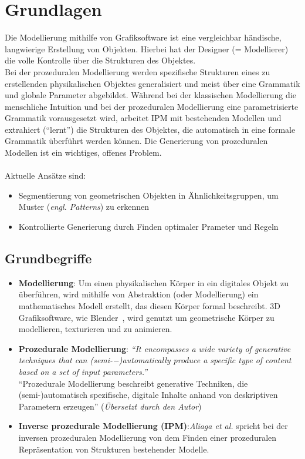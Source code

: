 
\chapter{Grundlagen}

Die Modellierung mithilfe von Grafiksoftware ist eine vergleichbar händische, langwierige Erstellung von
Objekten.
Hierbei hat der Designer (= Modellierer) die volle Kontrolle über die Strukturen des Objektes.\\
Bei der prozeduralen Modellierung werden spezifische Strukturen eines zu erstellenden physikalischen Objektes
generalisiert und meist über eine Grammatik und globale Parameter abgebildet.
Während bei der klassischen Modellierung die menschliche Intuition und bei der prozeduralen Modellierung eine
parametrisierte Grammatik vorausgesetzt wird, arbeitet IPM mit bestehenden Modellen und extrahiert ("`lernt"')
die Strukturen des Objektes, die automatisch in eine formale Grammatik überführt werden können.
Die Generierung von prozeduralen Modellen ist ein wichtiges, offenes Problem.
\\~\\
Aktuelle Ansätze sind:
\begin{itemize}
    \item Segmentierung von geometrischen Objekten in Ähnlichkeitsgruppen, um Muster (\textit{engl. Patterns}) zu
    erkennen
    \item Kontrollierte Generierung durch Finden optimaler Prameter und Regeln
\end{itemize}

\section{Grundbegriffe}

\begin{itemize}
    \item \textbf{Modellierung}: Um einen physikalischen Körper in ein digitales Objekt zu überführen, wird mithilfe
    von Abstraktion (oder Modellierung) ein mathematisches Modell erstellt, das diesen Körper formal beschreibt.
    3D Grafiksoftware, wie Blender~\cite{blender}, wird genutzt um geometrische Körper zu modellieren, texturieren
    und zu animieren.
    \item \textbf{Prozedurale Modellierung}: \textit{"`It encompasses a wide variety of generative techniques that
    can (semi-−)automatically produce a specific type of content based on a set of input
    parameters."'} \\
    "`Prozedurale Modellierung beschreibt generative Techniken, die \\(semi-)automatisch spezifische, digitale
    Inhalte anhand von deskriptiven Parametern erzeugen"' (\textit{Übersetzt durch den Autor})
    \item \textbf{Inverse prozedurale Modellierung (IPM)}:\textit{Aliaga et al.}
    spricht bei der inversen prozeduralen Modellierung von dem Finden einer prozeduralen Repräsentation von
    Strukturen bestehender Modelle.
\end{itemize}

